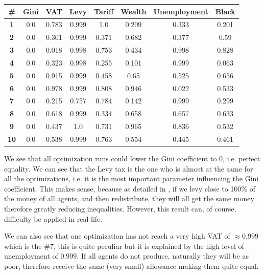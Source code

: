             \begin{table}[H]
            \centering
            \begin{tabular}{|c|c|c|c|c|c|c|c|}
                \hline
                \textbf{\#} & \textbf{Gini}  & \textbf{VAT} & \textbf{Levy} & \textbf{Tariff} & \textbf{Wealth} & \textbf{Unemployment} & \textbf{Black} \\ \hline
                \textbf{1} & 0.0 & 0.783 & 0.999 & 1.0 & 0.209 & 0.333 & 0.201 \\ \hline
                \textbf{2} & 0.0 & 0.301 & 0.999 & 0.371 & 0.682 & 0.377 & 0.59 \\ \hline
                \textbf{3} & 0.0 & 0.018 & 0.998 & 0.753 & 0.434 & 0.998 & 0.828 \\ \hline
                \textbf{4} & 0.0 & 0.323 & 0.998 & 0.255 & 0.101 & 0.999 & 0.063 \\ \hline
                \textbf{5} & 0.0 & 0.915 & 0.999 & 0.458 & 0.65 & 0.525 & 0.656 \\ \hline
                \textbf{6} & 0.0 & 0.978 & 0.999 & 0.808 & 0.946 & 0.022 & 0.533 \\ \hline
                \textbf{7} & 0.0 & 0.215 & 0.757 & 0.784 & 0.142 & 0.999 & 0.299 \\ \hline
                \textbf{8} & 0.0 & 0.618 & 0.999 & 0.334 & 0.658 & 0.657 & 0.633 \\ \hline
                \textbf{9} & 0.0 & 0.437 & 1.0 & 0.731 & 0.965 & 0.836 & 0.532 \\ \hline
                \textbf{10} & 0.0 & 0.538 & 0.999 & 0.763 & 0.554 & 0.445 & 0.461 \\ \hline
            \end{tabular}
            \end{table}

            We see that all optimization runs could lower the Gini coefficient to 0, i.e. perfect equality. We can see that the Levy tax is the one who is almost at the same for all the optimizations, i.e. it is the most important parameter influencing the Gini coefficient.  This makes sense, because as detailed in , if we levy close to 100\% of the money of all agents, and then redistribute, they will all get the same money therefore greatly reducing inequalities. However, this result can, of course, difficulty be applied in real life. 
            
            We can also see that one optimization has not reach a very high VAT of $\approx 0.999$ which is the \#7, this is quite peculiar but it is explained by the high level of unemployment of $0.999$. If all agents do not produce, naturally they will be as poor, therefore receive the same (very small) allowance making them quite equal.

